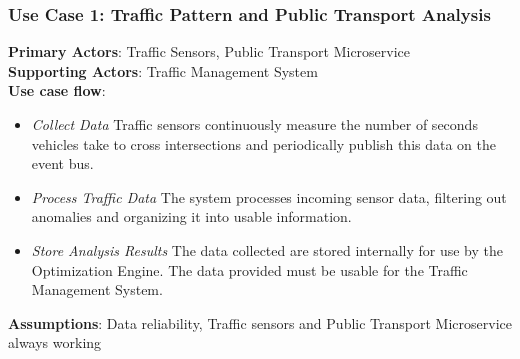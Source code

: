 \documentclass[a4paper,12pt]{article}
\begin{document}
\subsubsection*{Use Case 1: Traffic Pattern and Public Transport Analysis}
\textbf{Primary Actors}: Traffic Sensors, Public Transport Microservice \\
\textbf{Supporting Actors}: Traffic Management System \\ 
\textbf{Use case flow}: 
\begin{itemize}
    \item \textit{Collect Data} Traffic sensors continuously measure the number of seconds vehicles take to cross intersections and periodically publish this data on the event bus.
    \item \textit{Process Traffic Data} The system processes incoming sensor data, filtering out anomalies and organizing it into usable information.
    \item \textit{Store Analysis Results} The data collected are stored internally for use by the Optimization Engine. The data provided must be usable for the Traffic Management System.
\end{itemize}
\textbf{Assumptions}: Data reliability, Traffic sensors and Public Transport Microservice always working
\end{document}
